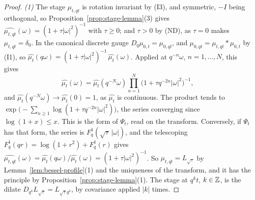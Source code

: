\begin{proof}
\leanok
{}
\emph{(1)} The stage $\mu_{t,qt}$ is rotation invariant by (I3), and symmetric, $-I$ being
orthogonal, so Proposition~\ref{prop:stage-lemma}(3) gives
$\widehat{\mu_{t,qt}}(\omega) = (1 + \tau|\omega|^2)^{-1}$ with $\tau \ge 0$; and $\tau > 0$ by
(ND), as $\tau = 0$ makes $\mu_{t,qt} = \delta_0$. In the canonical discrete gauge
$D_q\mu_{0,t} = \mu_{0,qt}$, and $\mu_{0,qt} = \mu_{t,qt} * \mu_{0,t}$ by (I1), so
$\widehat{\mu_t}(q\omega) = (1 + \tau|\omega|^2)^{-1}\,\widehat{\mu_t}(\omega)$. Applied at
$q^{-n}\omega$, $n = 1, \dots, N$, this gives
\[
  \widehat{\mu_t}(\omega) = \widehat{\mu_t}(q^{-N}\omega)\prod_{n=1}^N
    \bigl(1 + \tau q^{-2n}|\omega|^2\bigr)^{-1} ,
\]
and $\widehat{\mu_t}(q^{-N}\omega) \to \widehat{\mu_t}(0) = 1$, as $\widehat{\mu_t}$ is
continuous. The product tends to $\exp\bigl(-\sum_{n \ge 1}\log(1 + \tau q^{-2n}|\omega|^2)\bigr)$,
the series converging since $\log(1 + x) \le x$. This is the form of $\Psi_t$, read on the
transform. Conversely, if $\Psi_t$ has that form, the series is $F^1_q(\sqrt\tau\,|\omega|)$, and
the telescoping $F^1_q(qr) = \log(1 + r^2) + F^1_q(r)$ gives
$\widehat{\mu_{t,qt}}(\omega) = \widehat{\mu_t}(q\omega)/\widehat{\mu_t}(\omega) =
(1 + \tau|\omega|^2)^{-1}$. So $\mu_{t,qt} = L_{\sqrt\tau}$ by Lemma~\ref{lem:bessel-profile}(1)
and the uniqueness of the transform, and it has the principle by
Proposition~\ref{prop:stage-lemma}(1). The stage at $q^kt$, $k \in \mathbb{Z}$, is the dilate
$D_{q^k}L_{\sqrt\tau} = L_{\sqrt\tau q^k}$, by covariance applied $|k|$ times.


\end{proof}
